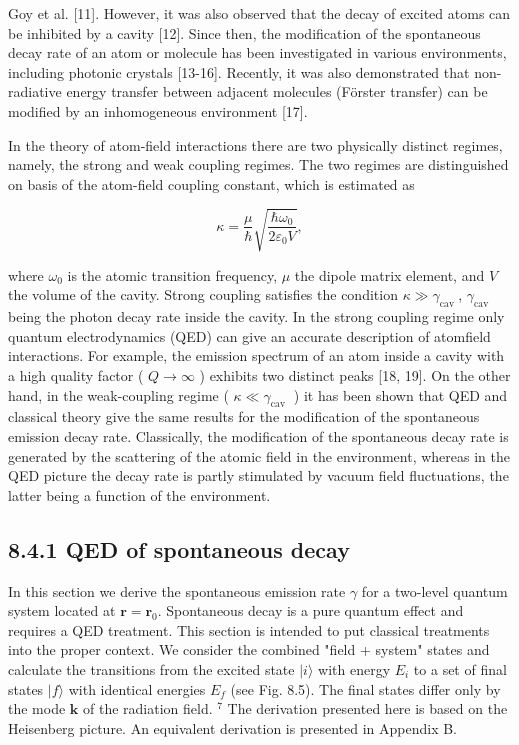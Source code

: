 \documentclass[10pt]{article}
\begin{document}
\captionsetup{singlelinecheck=false}
Goy et al. [11]. However, it was also observed that the decay of excited atoms can be inhibited by a cavity [12]. Since then, the modification of the spontaneous decay rate of an atom or molecule has been investigated in various environments, including photonic crystals [13-16]. Recently, it was also demonstrated that non-radiative energy transfer between adjacent molecules (Förster transfer) can be modified by an inhomogeneous environment [17].

In the theory of atom-field interactions there are two physically distinct regimes, namely, the strong and weak coupling regimes. The two regimes are distinguished on basis of the atom-field coupling constant, which is estimated as


\begin{equation*}
\kappa=\frac{\mu}{\hbar} \sqrt{\frac{\hbar \omega_{0}}{2 \varepsilon_{0} V}}, \tag{8.88}
\end{equation*}


where $\omega_{0}$ is the atomic transition frequency, $\mu$ the dipole matrix element, and $V$ the volume of the cavity. Strong coupling satisfies the condition $\kappa \gg \gamma_{\text {cav }}$, $\gamma_{\text {cav }}$ being the photon decay rate inside the cavity. In the strong coupling regime only quantum electrodynamics (QED) can give an accurate description of atomfield interactions. For example, the emission spectrum of an atom inside a cavity with a high quality factor ( $Q \rightarrow \infty$ ) exhibits two distinct peaks [18, 19]. On the other hand, in the weak-coupling regime ( $\kappa \ll \gamma_{\text {cav }}$ ) it has been shown that QED and classical theory give the same results for the modification of the spontaneous emission decay rate. Classically, the modification of the spontaneous decay rate is generated by the scattering of the atomic field in the environment, whereas in the QED picture the decay rate is partly stimulated by vacuum field fluctuations, the latter being a function of the environment.

\subsection*{8.4.1 QED of spontaneous decay}
In this section we derive the spontaneous emission rate $\gamma$ for a two-level quantum system located at $\mathbf{r}=\mathbf{r}_{0}$. Spontaneous decay is a pure quantum effect and requires a QED treatment. This section is intended to put classical treatments into the proper context. We consider the combined "field + system" states and calculate the transitions from the excited state $|i\rangle$ with energy $E_{i}$ to a set of final states $|f\rangle$ with identical energies $E_{f}$ (see Fig. 8.5). The final states differ only by the mode $\mathbf{k}$ of the radiation field. ${ }^{7}$ The derivation presented here is based on the Heisenberg picture. An equivalent derivation is presented in Appendix B.
\end{document}
